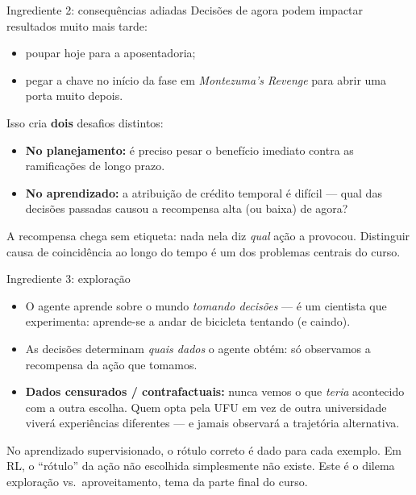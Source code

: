 \documentclass[aspectratio=169, 11pt]{beamer}
\begin{document}
\begin{frame}{Ingrediente 2: consequências adiadas}
  Decisões de agora podem impactar resultados muito mais tarde:
  \begin{itemize}
    \item poupar hoje para a aposentadoria;
    \item pegar a chave no início da fase em \emph{Montezuma's Revenge}
          para abrir uma porta muito depois.
  \end{itemize}

  \medskip
  Isso cria \textbf{dois} desafios distintos:
  \begin{itemize}
    \item \textbf{No planejamento:} é preciso pesar o benefício imediato
          contra as ramificações de longo prazo.
    \item \textbf{No aprendizado:} a \alert{atribuição de crédito temporal}
          é difícil — qual das decisões passadas causou a recompensa alta
          (ou baixa) de agora?
  \end{itemize}

  \begin{alertabox}
    A recompensa chega sem etiqueta: nada nela diz \emph{qual} ação a
    provocou. Distinguir causa de coincidência ao longo do tempo é um dos
    problemas centrais do curso.
  \end{alertabox}
\end{frame}

\begin{frame}{Ingrediente 3: exploração}
  \begin{itemize}
    \item O agente aprende sobre o mundo \emph{tomando decisões} — é um
          cientista que experimenta: aprende-se a andar de bicicleta
          tentando (e caindo).
    \item As decisões determinam \emph{quais dados} o agente obtém: só
          observamos a recompensa da ação que tomamos.
    \item \textbf{Dados censurados / contrafactuais:} nunca vemos o que
          \emph{teria} acontecido com a outra escolha. Quem opta pela UFU
          em vez de outra universidade viverá experiências diferentes — e
          jamais observará a trajetória alternativa.
  \end{itemize}

  \begin{ideiabox}
    No aprendizado supervisionado, o rótulo correto é dado para cada
    exemplo. Em RL, o ``rótulo'' da ação não escolhida simplesmente não
    existe. Este é o dilema \alert{exploração vs.\ aproveitamento}, tema da
    parte final do curso.
  \end{ideiabox}
\end{frame}
\end{document}
